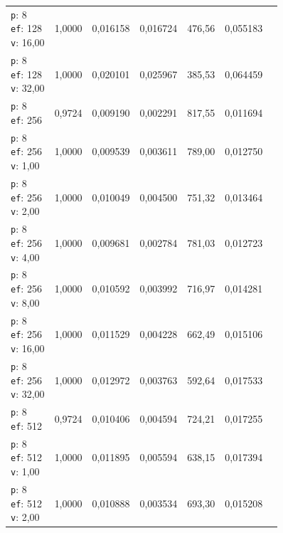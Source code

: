 \begin{table}[htbp]
\begin{tabularx}{\textwidth}{Xrrrrrr}
    \makecell{\texttt{p}: 8\\\texttt{ef}: 128\\\texttt{v}: 16,00} & 1,0000 & 0,016158 & 0,016724 & 476,56 & 0,055183 \\
    \makecell{\texttt{p}: 8\\\texttt{ef}: 128\\\texttt{v}: 32,00} & 1,0000 & 0,020101 & 0,025967 & 385,53 & 0,064459 \\
    \makecell{\texttt{p}: 8\\\texttt{ef}: 256} & 0,9724 & 0,009190 & 0,002291 & 817,55 & 0,011694 \\
    \makecell{\texttt{p}: 8\\\texttt{ef}: 256\\\texttt{v}: 1,00} & 1,0000 & 0,009539 & 0,003611 & 789,00 & 0,012750 \\
    \makecell{\texttt{p}: 8\\\texttt{ef}: 256\\\texttt{v}: 2,00} & 1,0000 & 0,010049 & 0,004500 & 751,32 & 0,013464 \\
    \makecell{\texttt{p}: 8\\\texttt{ef}: 256\\\texttt{v}: 4,00} & 1,0000 & 0,009681 & 0,002784 & 781,03 & 0,012723 \\
    \makecell{\texttt{p}: 8\\\texttt{ef}: 256\\\texttt{v}: 8,00} & 1,0000 & 0,010592 & 0,003992 & 716,97 & 0,014281 \\
    \makecell{\texttt{p}: 8\\\texttt{ef}: 256\\\texttt{v}: 16,00} & 1,0000 & 0,011529 & 0,004228 & 662,49 & 0,015106 \\
    \makecell{\texttt{p}: 8\\\texttt{ef}: 256\\\texttt{v}: 32,00} & 1,0000 & 0,012972 & 0,003763 & 592,64 & 0,017533 \\
    \makecell{\texttt{p}: 8\\\texttt{ef}: 512} & 0,9724 & 0,010406 & 0,004594 & 724,21 & 0,017255 \\
    \makecell{\texttt{p}: 8\\\texttt{ef}: 512\\\texttt{v}: 1,00} & 1,0000 & 0,011895 & 0,005594 & 638,15 & 0,017394 \\
    \makecell{\texttt{p}: 8\\\texttt{ef}: 512\\\texttt{v}: 2,00} & 1,0000 & 0,010888 & 0,003534 & 693,30 & 0,015208 \\

\end{tabularx}
\end{table}
